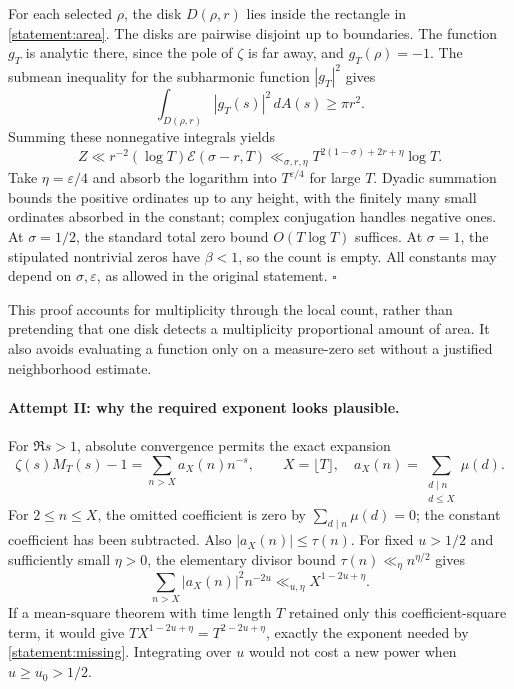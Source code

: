 \documentclass[11pt,a4paper]{article}
\numberwithin{equation}{section}
\begin{document}
For each selected $\rho$, the disk $D(\rho,r)$ lies inside the rectangle
in \eqref{statement:area}.  The disks are pairwise disjoint up to boundaries.
The function $g_T$ is analytic there, since the pole of $\zeta$ is far
away, and $g_T(\rho)=-1$.  The submean inequality for the subharmonic
function $|g_T|^2$ gives
\[
 \int_{D(\rho,r)}|g_T(s)|^2\,dA(s)\geq\pi r^2.
\]
Summing these nonnegative integrals yields
\begin{equation}\label{statement:detection}
 Z\ll r^{-2}(\log T)\mathcal E(\sigma-r,T)
   \ll_{\sigma,r,\eta}T^{2(1-\sigma)+2r+\eta}\log T.
\end{equation}
Take $\eta=\varepsilon/4$ and absorb the logarithm into
$T^{\varepsilon/4}$ for large $T$.  Dyadic summation bounds the positive
ordinates up to any height, with the finitely many small ordinates
absorbed in the constant; complex conjugation handles negative ones.
At $\sigma=1/2$, the standard total zero bound $O(T\log T)$ suffices.
At $\sigma=1$, the stipulated nontrivial zeros have $\beta<1$, so the
count is empty.  All constants may depend on $\sigma,\varepsilon$, as
allowed in the original statement. \hfill$\square$

This proof accounts for multiplicity through the local count, rather
than pretending that one disk detects a multiplicity proportional
amount of area.  It also avoids evaluating a function only on a
measure-zero set without a justified neighborhood estimate.

\paragraph{Attempt II: why the required exponent looks plausible.}
For $\Re s>1$, absolute convergence permits the exact expansion
\begin{equation}\label{statement:coefficients}
 \zeta(s)M_T(s)-1=\sum_{n>X}a_X(n)n^{-s},\qquad
 X=\lfloor T\rfloor,\quad
 a_X(n)=\sum_{\substack{d\mid n\\d\leq X}}\mu(d).
\end{equation}
For $2\leq n\leq X$, the omitted coefficient is zero by
$\sum_{d\mid n}\mu(d)=0$; the constant coefficient has been subtracted.
Also $|a_X(n)|\leq\tau(n)$.  For fixed $u>1/2$ and sufficiently small
$\eta>0$, the elementary divisor bound $\tau(n)\ll_\eta n^{\eta/2}$ gives
\begin{equation}\label{statement:diagonal}
 \sum_{n>X}|a_X(n)|^2n^{-2u}
 \ll_{u,\eta}X^{1-2u+\eta}.
\end{equation}
If a mean-square theorem with time length $T$ retained only this
coefficient-square term, it would give
$T X^{1-2u+\eta}=T^{2-2u+\eta}$, exactly the exponent needed by
\eqref{statement:missing}.  Integrating over $u$ would not cost a new power
when $u\geq u_0>1/2$.
\end{document}

